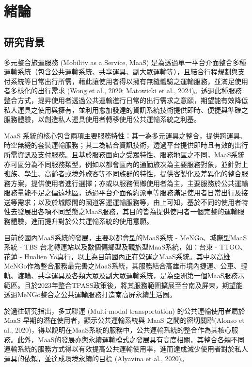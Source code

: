 
\providecommand{\tightlist}{%
  \setlength{\itemsep}{0pt}\setlength{\parskip}{0pt}
}

\chapter{緒論}\label{ux7dd2ux8ad6}

\section{研究背景}\label{ux7814ux7a76ux80ccux666f}

多元整合旅運服務 (Mobility as a Service, MaaS)
是為透過單一平台介面整合多種運輸系統（包含公共運輸系統、共享運具、副大眾運輸等），且結合行程規劃與支付系統等日常出行所需，藉此讓使用者得以擁有無縫體驗之運輸服務，並滿足使用者多樣化的出行需求
(Wong et al., 2020; Matowicki et al.,
2024)。透過此種服務整合方式，提昇使用者透過公共運輸進行日常的出行需求之意願，期望能有效降低私人運具之使用與擁有，並利用愈加發達的資訊系統技術提供即時、便捷與準確之服務體驗，以創造私人運具使用者轉移使用公共運輸系統之利基。

MaaS
系統的核心包含兩項主要服務特性：其一為多元運具之整合，提供跨運具、時空無縫的套裝運輸服務；其二為結合資訊技術，透過平台提供即時且有效的出行所需資訊及支付服務。且基於服務面向之受眾特性、服務地區之不同，MaaS系統亦可區分為不同服務類型，例如以都會區內的通勤旅次為主要服務對象，並針對上班族、學生、高齡者或境外旅客等不同族群的特性，提供客製化及差異化的整合服務方案，提供使用者進行選擇；亦或以服務偏鄉使用者為主，主要服務於公共運輸服務量能不足之偏遠地區，透過平台介面預約派車等服務滿足使用者日常出行及接送等需求；以及於城際間的國道客運運輸服務等，由上可知，基於不同的使用者特性去發展出各項不同型態之MaaS服務，其目的皆為提供使用者一個完整的運輸服務體驗，進而提升對於公共運輸系統的使用意願。

目前於國內MaaS系統的發展，主要以都會型的MaaS系統 - MeNGo、城際型MaaS系統
- TBS 台北轉運站以及數個偏鄉型及觀旅型MaaS系統，如：台東 - TTGO、花蓮 -
Hualien
Yo真行，以上為目前國內正在營運之MaaS系統。其中以高雄MeNGo作為整合服務最完善之MaaS系統，其服務結合高雄市境內捷運、公車、輕軌、渡輪、共享運具及各類大眾及副大眾運輸系統，是為亞洲第一個MaaS服務示範區。且於2023年整合TPASS政策後，將其服務範圍擴展至台南及屏東，期望能透過MeNGo整合之公共運輸服務打造南高屏永續生活圈。

於過往研究指出，多式聯運 (Multi-modal transportation)
的公共運輸使用者屬於 MaaS 早期的潛在使用者，顯示公共運輸系統與 MaaS
之間的密切關聯(Alonso et al.,
2020)，得以說明在MaaS系統的服務中，公共運輸系統的整合作為其核心服務。此外，MaaS的發展亦與永續運輸模式之發展具有高度相關，其整合各類不同運輸系統的服務方式得以有效提高公共運輸使用率，進而達成減少使用者對於私人運具的依賴，並達成環境永續的目標
(Alyavina et al., 2020)。

